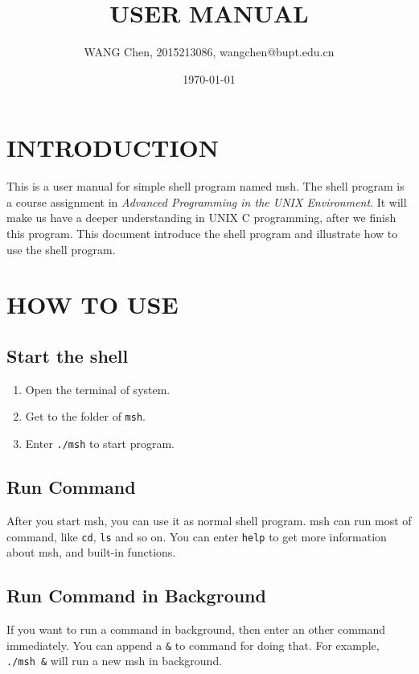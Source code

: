 \documentclass{article}
\title{USER MANUAL}
\author{WANG Chen, 2015213086, wangchen@bupt.edu.cn}
\date{\today}
\begin{document}
\maketitle

\tableofcontents

\newpage
\section{INTRODUCTION}

This is a user manual for simple shell program named msh.
The shell program is a course assignment in \emph{Advanced Programming in the UNIX Environment}.
It will make us have a deeper understanding in UNIX C programming, after we finish this program.
This document introduce the shell program and illustrate how to use the shell program.

\section{HOW TO USE}

\subsection{Start the shell}

\begin{enumerate}
\item Open the terminal of system.
\item Get to the folder of \verb|msh|.
\item Enter \verb|./msh| to start program.
\end{enumerate}

\subsection{Run Command}

After you start msh, you can use it as normal shell program.
msh can run most of command, like \verb|cd|, \verb|ls| and so on.
You can enter \verb|help| to get more information about msh, and built-in functions.

\subsection{Run Command in Background}

If you want to run a command in background, then enter an other command immediately.
You can append a \verb|&| to command for doing that.
For example, \verb|./msh &| will run a new msh in background.
\end{document}
